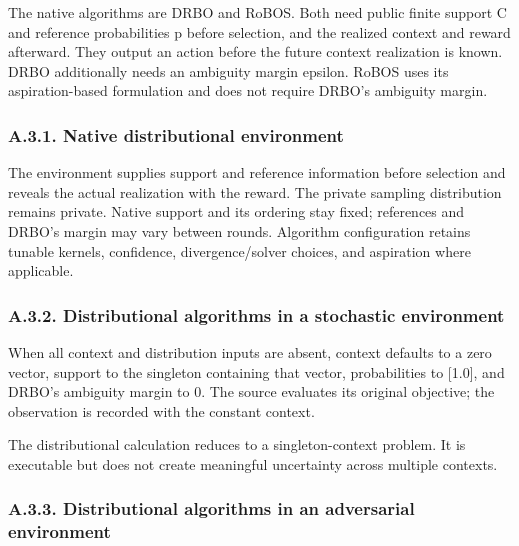 \documentclass[10pt,a4paper]{article}
\begin{document}
The native algorithms are DRBO and RoBOS. Both need public finite support C and reference probabilities p before selection,\allowbreak{} and the realized context and reward afterward. They output an action before the future context realization is known. DRBO additionally needs an ambiguity margin epsilon. RoBOS uses its aspiration-based formulation and does not require DRBO's ambiguity margin.


\subsubsection*{A.3.1. Native distributional environment}

The environment supplies support and reference information before selection and reveals the actual realization with the reward. The private sampling distribution remains private. Native support and its ordering stay fixed; references and DRBO's margin may vary between rounds. Algorithm configuration retains tunable kernels,\allowbreak{} confidence,\allowbreak{} divergence/solver choices,\allowbreak{} and aspiration where applicable.


\subsubsection*{A.3.2. Distributional algorithms in a stochastic environment}

When all context and distribution inputs are absent,\allowbreak{} context defaults to a zero vector,\allowbreak{} support to the singleton containing that vector,\allowbreak{} probabilities to [1.0],\allowbreak{} and DRBO's ambiguity margin to 0. The source evaluates its original objective; the observation is recorded with the constant context.


The distributional calculation reduces to a singleton-context problem. It is executable but does not create meaningful uncertainty across multiple contexts.


\subsubsection*{A.3.3. Distributional algorithms in an adversarial environment}
\end{document}
